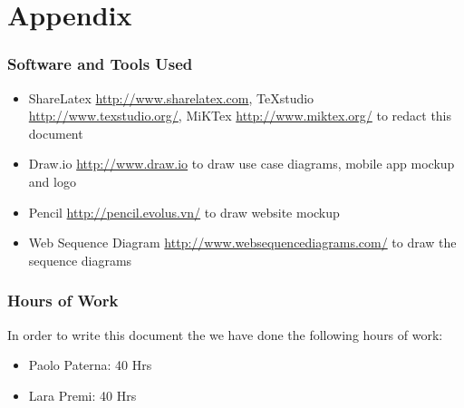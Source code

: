 \section{Appendix}
\subsubsection{Software and Tools Used}
	\begin{itemize}
		\item ShareLatex \url{http://www.sharelatex.com}, TeXstudio \url{http://www.texstudio.org/}, MiKTex \url{http://www.miktex.org/} to redact this document
		\item Draw.io \url{http://www.draw.io} to draw use case diagrams, mobile app mockup and logo
		\item Pencil \url{http://pencil.evolus.vn/} to draw website mockup
		\item Web Sequence Diagram \url{http://www.websequencediagrams.com/} to draw the sequence diagrams
	\end{itemize}
\subsubsection{Hours of Work}
	In order to write this document the we have done the following hours of work:
	\begin{itemize}
		\item Paolo Paterna: 40 Hrs
		\item Lara Premi: 40 Hrs
	\end{itemize}